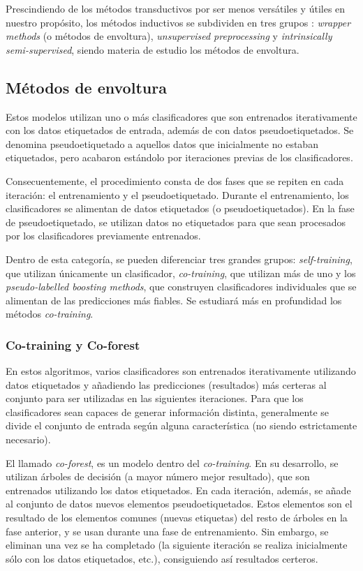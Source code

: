 Prescindiendo de los métodos transductivos por ser menos versátiles y útiles en nuestro propósito, los métodos inductivos se subdividen en tres grupos \cite{engelen2020surveyOnSemiSupervised}: \textit{wrapper methods} (o métodos de envoltura), \textit{unsupervised preprocessing} y \textit{intrinsically semi-supervised}, siendo materia de estudio los métodos de envoltura. 


\subsection{Métodos de envoltura}

Estos modelos utilizan uno o más clasificadores que son entrenados iterativamente con los datos etiquetados de entrada, además de con datos pseudoetiquetados. Se denomina pseudoetiquetado a aquellos datos que inicialmente no estaban etiquetados, pero acabaron estándolo por iteraciones previas de los clasificadores.

Consecuentemente, el procedimiento consta de dos fases que se repiten en cada iteración: el entrenamiento y el pseudoetiquetado. Durante el entrenamiento, los clasificadores se alimentan de datos etiquetados (o pseudoetiquetados). En la fase de pseudoetiquetado, se utilizan datos no etiquetados para que sean procesados por los clasificadores previamente entrenados. 

Dentro de esta categoría, se pueden diferenciar tres grandes grupos: \textit{self-training}, que utilizan únicamente un clasificador, \textit{co-training}, que utilizan más de uno y los \textit{pseudo-labelled boosting methods}, que construyen clasificadores individuales que se alimentan de las predicciones más fiables. Se estudiará más en profundidad los métodos \textit{co-training}.

\subsubsection{Co-training y Co-forest}

En estos algoritmos, varios clasificadores son entrenados iterativamente utilizando datos etiquetados y añadiendo las predicciones (resultados) más certeras al conjunto para ser utilizadas en las siguientes iteraciones. Para que los clasificadores sean capaces de generar información distinta, generalmente se divide el conjunto de entrada según alguna característica (no siendo estrictamente necesario).

El llamado \textit{co-forest}, es un modelo dentro del \textit{co-training}. En su desarrollo, se utilizan árboles de decisión (a mayor número mejor resultado), que son entrenados utilizando los datos etiquetados. En cada iteración, además, se añade al conjunto de datos nuevos elementos pseudoetiquetados. Estos elementos son el resultado de los elementos comunes (nuevas etiquetas) del resto de árboles en la fase anterior, y se usan durante una fase de entrenamiento. Sin embargo, se eliminan una vez se ha completado (la siguiente iteración se realiza inicialmente sólo con los datos etiquetados, etc.), consiguiendo así resultados certeros.

